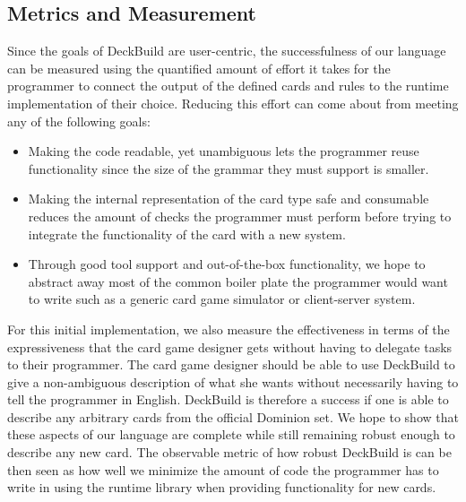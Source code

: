 \subsection{Metrics and Measurement}
Since the goals of DeckBuild are user-centric, the successfulness of our language can be measured using the quantified
amount of effort it takes for the programmer to connect the output of the defined cards and rules to the runtime implementation of their
choice. Reducing this effort can come about from meeting any of the following goals:
\begin{itemize}
\item Making the code readable, yet unambiguous
lets the programmer reuse functionality since the size of the grammar they must support is smaller.
\item Making the internal representation of
the card type safe and consumable reduces the amount of checks the programmer must perform before trying to integrate the functionality of
the card with a new system.
\item Through good tool support and out-of-the-box functionality, we hope to abstract away most of the common
boiler plate the programmer would want to write such as a generic card game simulator or client-server system.
\end{itemize}
For this initial implementation, we also measure the effectiveness in terms of the expressiveness that the card game designer gets
without having to delegate tasks to their programmer. The card game designer should be able to use DeckBuild to give a non-ambiguous
description of what she wants without necessarily having to tell the programmer in English.
DeckBuild is therefore a success if one is able to describe any arbitrary cards from the
official Dominion set. We hope to show that these aspects of our language are complete while still remaining robust enough to describe any
new card. The observable metric of how robust DeckBuild is can be then seen as how well we minimize the amount of code the programmer has to
write in using the runtime library when providing functionality for new cards.
